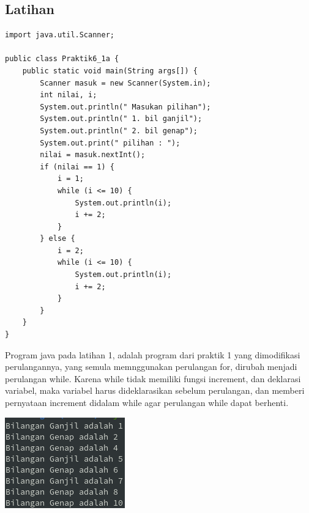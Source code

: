 \documentclass[a4paper,12pt]{article}
\begin{document}
\subsection{Latihan}
\begin{lstlisting}
import java.util.Scanner;

public class Praktik6_1a {
    public static void main(String args[]) {
        Scanner masuk = new Scanner(System.in);
        int nilai, i;
        System.out.println(" Masukan pilihan");
        System.out.println(" 1. bil ganjil");
        System.out.println(" 2. bil genap");
        System.out.print(" pilihan : ");
        nilai = masuk.nextInt();
        if (nilai == 1) {
            i = 1;
            while (i <= 10) {
                System.out.println(i);
                i += 2;
            }
        } else {
            i = 2;
            while (i <= 10) {
                System.out.println(i);
                i += 2;
            }
        }
    }
}
\end{lstlisting}
Program java pada latihan 1, adalah program dari praktik 1 yang dimodifikasi perulangannya, yang semula memnggunakan perulangan for, dirubah menjadi perulangan while. Karena while tidak
memiliki fungsi increment, dan deklarasi variabel, maka variabel harus dideklarasikan sebelum perulangan, dan memberi pernyataan increment didalam while agar perulangan while dapat
berhenti.
\begin{center}
    \includegraphics[scale=.8]{6.png}
\end{center}
\end{document}
